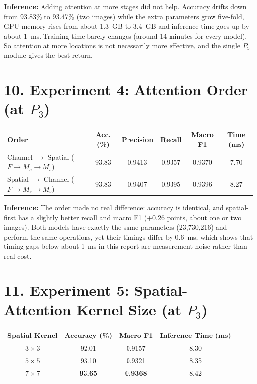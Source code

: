 \documentclass[10pt]{article}
\begin{document}
\textbf{Inference:} Adding attention at more stages did not help. Accuracy
drifts down from 93.83\% to 93.47\% (two images) while the extra
parameters grow five-fold, GPU memory rises from about 1.3~GB to
3.4~GB and inference time goes up by about 1~ms. Training time barely
changes (around 14 minutes for every model). So attention at more locations is not necessarily more
effective, and the single $P_3$ module gives the best return.
\section*{10. Experiment 4: Attention Order (at $P_3$)}

\begin{center}
\small
\begin{tabular}{|l|c|c|c|c|c|}
\hline
Order & Acc. (\%) & Precision & Recall & Macro F1 & Time (ms)\\
\hline
Channel $\rightarrow$ Spatial ($F\rightarrow M_c\rightarrow M_s$) & 93.83 & 0.9413 & 0.9357 & 0.9370 & 7.70\\
Spatial $\rightarrow$ Channel ($F\rightarrow M_s\rightarrow M_c$) & 93.83 & 0.9407 & 0.9395 & 0.9396 & 8.27\\
\hline
\end{tabular}
\end{center}

\textbf{Inference:} The order made no real difference: accuracy is
identical, and spatial-first has a slightly better recall and macro F1
(+0.26 points, about one or two images). Both models have exactly the same
parameters (23{,}730{,}216) and perform the same operations, yet their
timings differ by 0.6~ms, which shows that timing gaps below about 1~ms in
this report are measurement noise rather than real cost.

\section*{11. Experiment 5: Spatial-Attention Kernel Size (at $P_3$)}

\begin{center}
\begin{tabular}{|c|c|c|c|}
\hline
Spatial Kernel & Accuracy (\%) & Macro F1 & Inference Time (ms)\\
\hline
$3\times3$ & 92.01 & 0.9157 & 8.30\\
$5\times5$ & 93.10 & 0.9321 & 8.35\\
$7\times7$ & \textbf{93.65} & \textbf{0.9368} & 8.42\\
\hline
\end{tabular}
\end{center}
\end{document}

